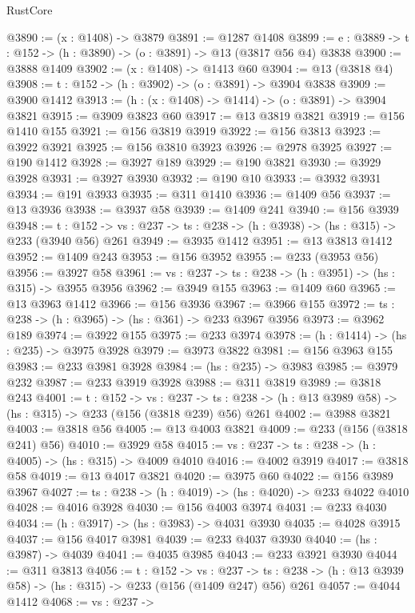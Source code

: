\begin{lexlean}{RustCore}
\begin{coremodule}
@3890 := (x : @1408) -> @3879
@3891 := @1287 @1408
@3899 := {e : @3889} -> {t : @152} -> (h : @3890) -> (o : @3891) -> @13 (@3817 @56 @4) @3838
@3900 := @3888 @1409
@3902 := (x : @1408) -> @1413 @60
@3904 := @13 (@3818 @4)
@3908 := {t : @152} -> (h : @3902) -> (o : @3891) -> @3904 @3838
@3909 := @3900 @1412
@3913 := (h : (x : @1408) -> @1414) -> (o : @3891) -> @3904 @3821
@3915 := @3909 @3823 @60
@3917 := @13 @3819 @3821
@3919 := @156 @1410 @155
@3921 := @156 @3819 @3919
@3922 := @156 @3813
@3923 := @3922 @3921
@3925 := @156 @3810 @3923
@3926 := @2978 @3925
@3927 := @190 @1412
@3928 := @3927 @189
@3929 := @190 @3821
@3930 := @3929 @3928
@3931 := @3927 @3930
@3932 := @190 @10
@3933 := @3932 @3931
@3934 := @191 @3933
@3935 := @311 @1410
@3936 := @1409 @56
@3937 := @13 @3936
@3938 := @3937 @58
@3939 := @1409 @241
@3940 := @156 @3939
@3948 := {t : @152} ->
  {vs : @237} -> {ts : @238} -> (h : @3938) -> (hs : @315) -> @233 (@3940 @56) @261
@3949 := @3935 @1412
@3951 := @13 @3813 @1412
@3952 := @1409 @243
@3953 := @156 @3952
@3955 := @233 (@3953 @56)
@3956 := @3927 @58
@3961 := {vs : @237} -> {ts : @238} -> (h : @3951) -> (hs : @315) -> @3955 @3956
@3962 := @3949 @155
@3963 := @1409 @60
@3965 := @13 @3963 @1412
@3966 := @156 @3936
@3967 := @3966 @155
@3972 := {ts : @238} -> (h : @3965) -> (hs : @361) -> @233 @3967 @3956
@3973 := @3962 @189
@3974 := @3922 @155
@3975 := @233 @3974
@3978 := (h : @1414) -> (hs : @235) -> @3975 @3928
@3979 := @3973 @3822
@3981 := @156 @3963 @155
@3983 := @233 @3981 @3928
@3984 := (hs : @235) -> @3983
@3985 := @3979 @232
@3987 := @233 @3919 @3928
@3988 := @311 @3819
@3989 := @3818 @243
@4001 := {t : @152} ->
  {vs : @237} ->
  {ts : @238} -> (h : @13 @3989 @58) -> (hs : @315) -> @233 (@156 (@3818 @239) @56) @261
@4002 := @3988 @3821
@4003 := @3818 @56
@4005 := @13 @4003 @3821
@4009 := @233 (@156 (@3818 @241) @56)
@4010 := @3929 @58
@4015 := {vs : @237} -> {ts : @238} -> (h : @4005) -> (hs : @315) -> @4009 @4010
@4016 := @4002 @3919
@4017 := @3818 @58
@4019 := @13 @4017 @3821
@4020 := @3975 @60
@4022 := @156 @3989 @3967
@4027 := {ts : @238} -> (h : @4019) -> (hs : @4020) -> @233 @4022 @4010
@4028 := @4016 @3928
@4030 := @156 @4003 @3974
@4031 := @233 @4030
@4034 := (h : @3917) -> (hs : @3983) -> @4031 @3930
@4035 := @4028 @3915
@4037 := @156 @4017 @3981
@4039 := @233 @4037 @3930
@4040 := (hs : @3987) -> @4039
@4041 := @4035 @3985
@4043 := @233 @3921 @3930
@4044 := @311 @3813
@4056 := {t : @152} ->
  {vs : @237} ->
  {ts : @238} -> (h : @13 @3939 @58) -> (hs : @315) -> @233 (@156 (@1409 @247) @56) @261
@4057 := @4044 @1412
@4068 := {vs : @237} ->

\end{coremodule}
\end{lexlean}
